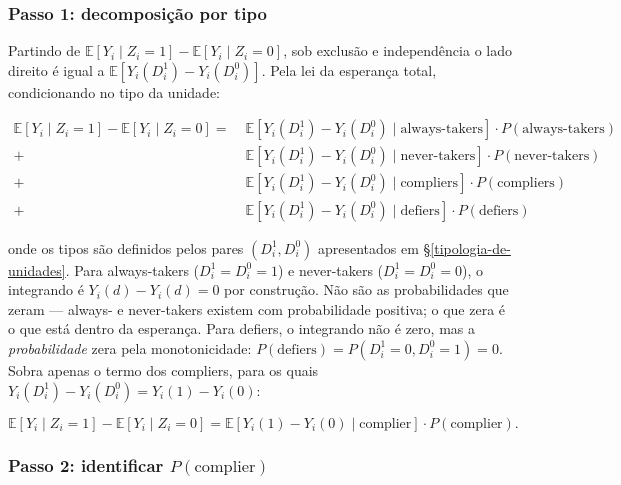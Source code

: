\documentclass[
]{article}
\begin{document}
\subsubsection{Passo 1: decomposição por tipo}\label{passo-1-decomposiuxe7uxe3o-por-tipo}

Partindo de \(\mathbb{E}[Y_i \mid Z_i = 1] - \mathbb{E}[Y_i \mid Z_i = 0]\), sob exclusão e independência o lado direito é igual a \(\mathbb{E}[Y_i(D^1_i) - Y_i(D^0_i)]\). Pela lei da esperança total, condicionando no tipo da unidade:

\begin{align}
  \mathbb{E}[Y_i \mid Z_i = 1] - \mathbb{E}[Y_i \mid Z_i = 0]
   =\;& \mathbb{E}[Y_i(D^1_i) - Y_i(D^0_i) \mid \text{always-takers}] \cdot P(\text{always-takers}) \\
    +& \mathbb{E}[Y_i(D^1_i) - Y_i(D^0_i) \mid \text{never-takers}] \cdot P(\text{never-takers}) \\
    +& \mathbb{E}[Y_i(D^1_i) - Y_i(D^0_i) \mid \text{compliers}] \cdot P(\text{compliers}) \\
    +& \mathbb{E}[Y_i(D^1_i) - Y_i(D^0_i) \mid \text{defiers}] \cdot P(\text{defiers})
\end{align}

onde os tipos são definidos pelos pares \((D^1_i, D^0_i)\) apresentados em §\ref{tipologia-de-unidades}. Para always-takers (\(D^1_i = D^0_i = 1\)) e never-takers (\(D^1_i = D^0_i = 0\)), o integrando é \(Y_i(d) - Y_i(d) = 0\) por construção. Não são as probabilidades que zeram --- always- e never-takers existem com probabilidade positiva; o que zera é o que está dentro da esperança. Para defiers, o integrando não é zero, mas a \emph{probabilidade} zera pela monotonicidade: \(P(\text{defiers}) = P(D^1_i = 0, D^0_i = 1) = 0\). Sobra apenas o termo dos compliers, para os quais \(Y_i(D^1_i) - Y_i(D^0_i) = Y_i(1) - Y_i(0)\):

\begin{equation}
\mathbb{E}[Y_i \mid Z_i = 1] - \mathbb{E}[Y_i \mid Z_i = 0] = \mathbb{E}[Y_i(1) - Y_i(0) \mid \text{complier}] \cdot P(\text{complier}).
\label{eq:itt-complier}
\end{equation}

\subsubsection{\texorpdfstring{Passo 2: identificar \(P(\text{complier})\)}{Passo 2: identificar P(\textbackslash text\{complier\})}}\label{passo-2-identificar-ptextcomplier}
\end{document}
